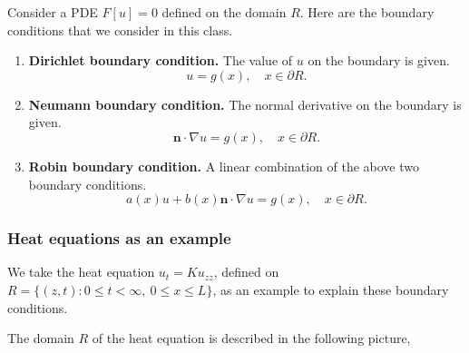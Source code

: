 \begin{definition} Consider a PDE $F[u] = 0$ defined on the domain $R$. Here are the boundary conditions that we consider in this class.
    \begin{enumerate}
        \item \textbf{Dirichlet boundary condition.} The value of $u$ on the boundary is given.
        \begin{equation}\label{eq.Dirichlet_boundary}
            u=g(x), \quad x \in \partial R .
        \end{equation}
        
        \item \textbf{Neumann boundary condition.} The normal derivative on the boundary is given.
        \begin{equation}\label{eq.Neumann_boundary}
            \mathbf{n} \cdot \nabla u=g(x), \quad x \in \partial R .
        \end{equation}
        
        \item \textbf{Robin boundary condition.} A linear combination of the above two boundary conditions. 
        \begin{equation}\label{eq.Robin_boundary}
            a(x) u+b(x) \mathbf{n} \cdot \nabla u=g(x), \quad x \in \partial R .
        \end{equation}
    \end{enumerate}
\end{definition}

\subsubsection{Heat equations as an example}

We take the heat equation $u_t = Ku_{zz}$, defined on $R = \{(z, t): 0 \le t < \infty,\ 0 \le x \le L\}$, as an example to explain these boundary conditions. 


The domain $R$ of the heat equation is described in the following picture,

